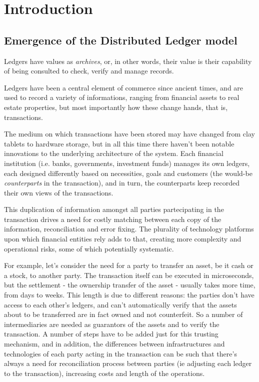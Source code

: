 \chapter{Introduction}
\label{chap:introduction}


\section{Emergence of the Distributed Ledger model}

Ledgers have values as \textit{archives}, or, in other words, their value is their capability of being consulted to check, verify and manage records.

Ledgers have been a central element of commerce since ancient times, and are used to record a variety of informations, ranging from financial assets to real estate properties, but most importantly how these change hands, that is, transactions.

The medium on which transactions have been stored may have changed from clay tablets to hardware storage, but in all this time there haven't been notable innovations to the underlying architecture of the system.
Each financial institution (i.e. banks, governments, investment funds) manages its own ledgers, each designed differently based on necessities, goals and customers (the would-be \textit{counterparts} in the transaction), and in turn, the counterparts keep recorded their own views of the transactions.

This duplication of information amongst all parties partecipating in the transaction drives a need for costly matching between each copy of the information, reconciliation and error fixing. The plurality of technology platforms upon which financial entities rely adds to that, creating more complexity and operational risks, some of which potentially systematic. 

For example, let's consider the need for a party to transfer an asset, be it cash or a stock, to another party. The transaction itself can be executed in microseconds, but the settlement - the ownership transfer of the asset - usually takes more time, from days to weeks.
This length is due to different reasons: the parties don't have access to each other's ledgers, and can't automatically verify that the assets about to be transferred are in fact owned and not counterfeit. So a number of intermediaries are needed as guarantors of the assets and to verify the transaction. 
A number of steps have to be added just for this trusting mechanism, and in addition, the differences between infrastructures and technologies of each party acting in the transaction can be such that there's always a need for reconciliation process between parties (ie adjusting each ledger to the transaction), increasing costs and length of the operations.  

